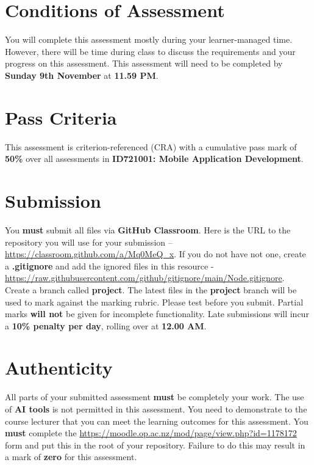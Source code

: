 \documentclass{article}
\begin{document}
\section*{Conditions of Assessment}
You will complete this assessment mostly during your learner-managed time. However, there will be time during class to discuss the requirements and your progress on this assessment. This assessment will need to be completed by \textbf{Sunday 9th November} at \textbf{11.59 PM}. 

\section*{Pass Criteria}
This assessment is criterion-referenced (CRA) with a cumulative pass mark of \textbf{50\%} over all assessments in \textbf{ID721001: Mobile Application Development}.

\section*{Submission}
You \textbf{must} submit all files via \textbf{GitHub Classroom}. Here is the URL to the repository you will use for your submission – \href{https://classroom.github.com/a/Mq0MeQ\_x}{https://classroom.github.com/a/Mq0MeQ\_x}. If you do not have not one, create a \textbf{.gitignore} and add the ignored files in this resource - \href{https://raw.githubusercontent.com/github/gitignore/main/Node.gitignore}{https://raw.githubusercontent.com/github/gitignore/main/Node.gitignore}. \\

Create a branch called \textbf{project}. The latest files in the \textbf{project} branch will be used to mark against the marking rubric. Please test before you submit. Partial marks \textbf{will not} be given for incomplete functionality. Late submissions will incur a \textbf{10\% penalty per day}, rolling over at \textbf{12.00 AM}.

\section*{Authenticity}
All parts of your submitted assessment \textbf{must} be completely your work. The use of \textbf{AI tools} is not permitted in this assessment. You need to demonstrate to the course lecturer that you can meet the learning outcomes for this assessment. You \textbf{must} complete the \href{Academic Integrity Declaration}{https://moodle.op.ac.nz/mod/page/view.php?id=1178172} form and put this in the root of your repository. Failure to do this may result in a mark of \textbf{zero} for this assessment.
\end{document}
